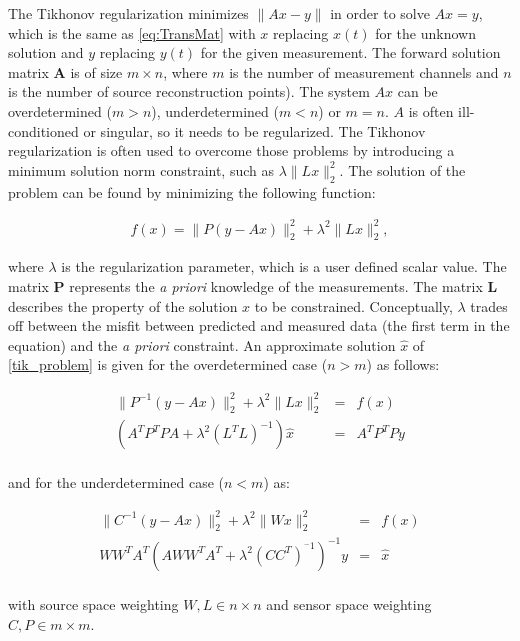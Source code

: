 The Tikhonov regularization minimizes $ \| Ax - y \|$ in order to solve $Ax=y$,
which is the same as \autoref{eq:TransMat} with $x$ replacing $x(t)$ for the
unknown solution and $y$ replacing $y(t)$ for the given measurement. The
forward solution matrix $\mathbf{A}$ is of size $m\times n$, where $m$ is the
number of measurement channels and $n$ is the number of source reconstruction
points). The system $Ax$ can be overdetermined ($m > n$), underdetermined
($m <n$) or $m=n$. $A$ is often ill-conditioned or singular, so it needs to be
regularized. The Tikhonov regularization is often used to overcome those
problems by introducing a minimum solution norm constraint, such as
$\lambda \|Lx\|_2^2$. The solution of the problem can be found by
minimizing the following function:
\begin{center}
\begin{eqnarray}
    f (x) = \| P (y - A x) \|^{2}_{2} + \lambda^{2} \| Lx \|^{2}_{2},
\label{tik_problem}
\end{eqnarray}
\end{center}


\noindent where $\lambda$ is the regularization parameter, which is a user
defined scalar value. The matrix $\mathbf{P}$ represents the \textit{a
priori} knowledge of the measurements. The matrix $\mathbf{L}$ describes
the property of the solution $x$ to be constrained. Conceptually, $\lambda$
trades off between the misfit between predicted and measured data (the
first term in the equation) and the \textit{a priori} constraint. An
approximate solution $\hat{x}$ of \autoref{tik_problem} is given for the
overdetermined case ($n > m$) as follows:
\begin{center}
\begin{eqnarray}
    \| P^{-1} (y - A x) \|^{2}_{2} + \lambda^{2} \| L x \|^{2}_{2} &=& f(x)
\nonumber \\
    (A^{T} P^{T} P A + \lambda^{2} (L^{T} L)^{-1}) \hat{x} &=& A^{T} P^{T} P
y \\
\label{tik_problem_overdet}
\end{eqnarray}
\end{center}

\noindent and for the underdetermined case ($n < m$) as:

\begin{center}
\begin{eqnarray}
   \| C^{-1} (y - A x) \|^{2}_{2} + \lambda^{2} \| Wx \|^{2}_{2} &=& f(x)
\nonumber\\
   W {W}^{T} A^{T} (A W {W}^{T} A^{T} + \lambda^{2} (C
C^{T})^{^-1})^{-1} y &=& \hat{x} \\
\label{tik_problem_underdet}
\end{eqnarray}
\end{center}
\noindent with source space weighting $ W,L \in n \times n $ and sensor space
weighting $ C,P \in m \times m $.

